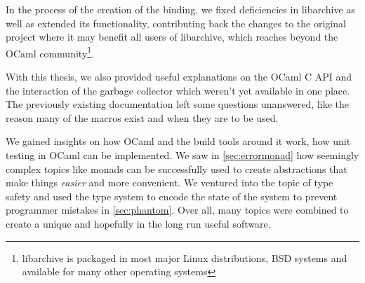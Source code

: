\documentclass[parskip=half]{scrreprt}
\begin{document}
In the process of the creation of the binding, we fixed deficiencies in
libarchive as well as extended its functionality, contributing back the changes
to the original project where it may benefit all users of libarchive, which
reaches beyond the OCaml community\footnote{libarchive is packaged in most
major Linux distributions, BSD systems and available for many other
operating systems}.

With this thesis, we also provided useful explanations on the OCaml C API and
the interaction of the garbage collector which weren't yet available in one
place. The previously existing documentation left some questions unanswered,
like the reason many of the macros exist and when they are to be used.

We gained insights on how OCaml and the build tools around it work, how unit
testing in OCaml can be implemented. We saw in \autoref{sec:errormonad} how
seemingly complex topics like monads can be successfully used to create
abstractions that make things \emph{easier} and more convenient. We ventured
into the topic of type safety and used the type system to encode the state of
the system to prevent programmer mistakes in \autoref{sec:phantom}. Over all,
many topics were combined to create a unique and hopefully in the long run
useful software.

\printbibliography
\end{document}
